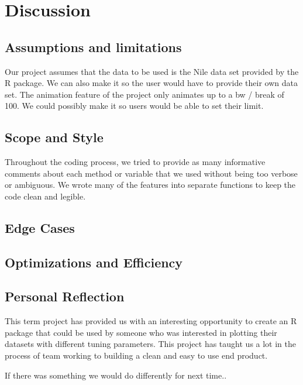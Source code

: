 \documentclass{article}
\begin{document}
\section{Discussion}
\subsection{Assumptions and limitations}
Our project assumes that the data to be used is the Nile data set provided by the R package. We can also make it so the user would have to provide their own data set. 
The animation feature of the project only animates up to a bw / break of 100. We could possibly make it so users would be able to set their limit. 

\subsection{Scope and Style}
Throughout the coding process, we tried to provide as many informative comments about each method or variable that we used without being too verbose or ambiguous. We wrote many of the features into separate functions to keep the code clean and legible. 

\subsection{Edge Cases}

\subsection{Optimizations and Efficiency}


\subsection{Personal Reflection}
This term project has provided us with an interesting opportunity to create an R package that could be used by someone who was interested in plotting their datasets with different tuning parameters. 
This project has taught us a lot in the process of team working to building a clean and easy to use end product. 

If there was something we would do differently for next time..

\newpage

\appendixpage

\end{document}
